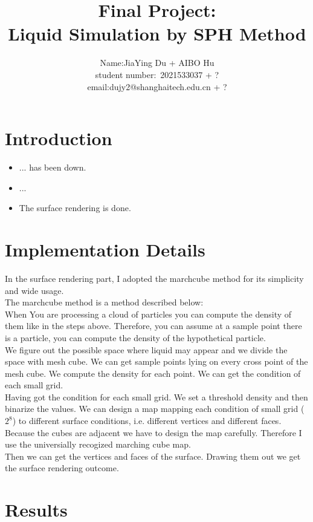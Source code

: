 \documentclass[acmtog]{acmart}
\title{Final Project:\\ {Liquid Simulation by SPH Method}}
\author{Name:\quad JiaYing Du + AIBO Hu  \\ student number:\ 2021533037 + ?
\\email:\quad dujy2@shanghaitech.edu.cn + ?}
\begin{document}
\maketitle

\vspace*{2 ex}

\section{Introduction}
\begin{itemize}
\item ... has been down.
\item ...
\item The surface rendering is done.
\end{itemize}
\section{Implementation Details}
\item In the surface rendering part, I adopted the marchcube method for its simplicity and wide usage.\\
The marchcube method is a method described below:\\
When You are processing a cloud of particles you can compute the density of them like in the steps above. Therefore, 
you can assume at a sample point there is a particle, you can compute the density of the hypothetical particle.\\
We figure out the possible space where liquid may appear and we divide the space with mesh cube. We can get sample points lying on 
every cross point of the mesh cube. We compute the density for each point. We can get the condition of each small grid.\\
Having got the condition for each small grid. We set a threshold density and then binarize the values. We can design a map mapping each condition of small grid ($2^8$) to 
different surface conditions, i.e. different vertices and different faces. Because the cubes are adjacent we have to design the map carefully. 
Therefore I use the universially recogized marching cube map.\\
Then we can get the vertices and faces of the surface. Drawing them out we get the surface rendering outcome.
\section{Results}
\end{document}
